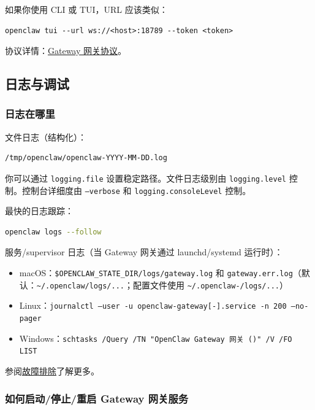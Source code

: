 如果你使用 CLI 或 TUI，URL 应该类似：

\begin{lstlisting}
openclaw tui --url ws://<host>:18789 --token <token>
\end{lstlisting}


协议详情：\href{/gateway/protocol}{Gateway 网关协议}。

\subsection{日志与调试}


\subsubsection{日志在哪里}


文件日志（结构化）：

\begin{lstlisting}
/tmp/openclaw/openclaw-YYYY-MM-DD.log
\end{lstlisting}


你可以通过 \texttt{logging.file} 设置稳定路径。文件日志级别由 \texttt{logging.level} 控制。控制台详细度由 \texttt{--verbose} 和 \texttt{logging.consoleLevel} 控制。

最快的日志跟踪：

\begin{lstlisting}[language=bash]
openclaw logs --follow
\end{lstlisting}


服务/supervisor 日志（当 Gateway 网关通过 launchd/systemd 运行时）：

\begin{itemize}
  \item macOS：\texttt{\$OPENCLAW\_STATE\_DIR/logs/gateway.log} 和 \texttt{gateway.err.log}（默认：\texttt{\textasciitilde{}/.openclaw/logs/...}；配置文件使用 \texttt{\textasciitilde{}/.openclaw-/logs/...}）
  \item Linux：\texttt{journalctl --user -u openclaw-gateway[-].service -n 200 --no-pager}
  \item Windows：\texttt{schtasks /Query /TN "OpenClaw Gateway 网关 ()" /V /FO LIST}
\end{itemize}


参阅\href{/gateway/troubleshooting\#log-locations}{故障排除}了解更多。

\subsubsection{如何启动/停止/重启 Gateway 网关服务}


